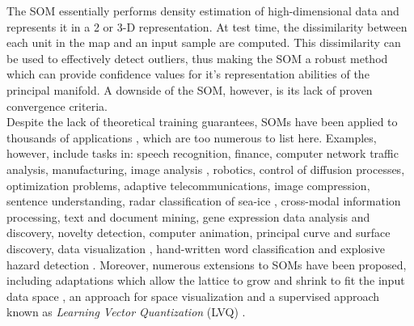 The SOM essentially performs density estimation of high-dimensional data and represents it in a 2 or 3-D representation.  At test time, the dissimilarity between each unit in the map and an input sample are computed.  This dissimilarity can be used to effectively detect outliers, thus making the SOM a robust method which can provide confidence values for it's representation abilities of the principal manifold.  A downside of the SOM, however, is its lack of proven convergence criteria.  \\

Despite the lack of theoretical training guarantees, SOMs have been applied to thousands of applications \citep{Yin2007SOM}, which are too numerous to list here.  Examples, however, include tasks in: speech recognition, finance, computer network traffic analysis, manufacturing, image analysis \citep{Rauber2002GHSOM,Palomo2017GHNG}, robotics, control of diffusion processes, optimization problems, adaptive telecommunications, image compression, sentence understanding, radar classification of sea-ice \citep{Kohonen1990SOM}, cross-modal information processing, text and document mining, gene expression data analysis and discovery, novelty detection, computer animation, principal curve and surface discovery, data visualization \citep{Yin2007SOM}, hand-written word classification \citep{Chiang1997HandWrittenWords} and explosive hazard detection \citep{Frigui2009LandmineSOM}.  Moreover, numerous extensions to SOMs have been proposed, including adaptations which allow the lattice to grow and shrink to fit the input data space \citep{Rauber2002GHSOM}, an approach for space visualization \citep{Yin2007SOM} and a supervised approach known as \textit{Learning Vector Quantization} (LVQ) \citep{Kohonen1995LVQ}.\\

